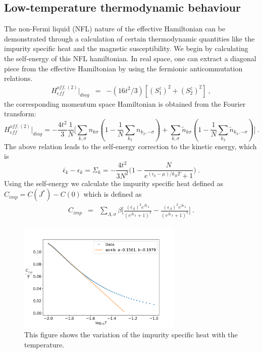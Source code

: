 \documentclass[reprint,onecolumn,prb,superscriptaddress]{revtex4-2}
\begin{document}
\subsection{Low-temperature thermodynamic behaviour}
The non-Fermi liquid (NFL) nature of the effective Hamiltonian can be demonstrated through a calculation of certain thermodynamic quantities like the impurity specific heat and the magnetic susceptibility. We begin by calculating the self-energy of this NFL hamiltonian. In real space, one can extract a diagonal piece from the effective Hamiltonian by using the fermionic anticommutation relations.
\begin{eqnarray}
H_{eff}^{off,(2)} |_{diag} &=& -(16t^2/3) [ (S_1^z)^2+ (S_2^z)^2 ] ~,
\end{eqnarray}
the corresponding momentum space Hamiltonian is obtained from the Fourier transform:
\begin{equation}
H_{eff}^{off,(2)} |_{diag}= -\frac{4t^2}{3} \frac{1}{N} \bigg[ \displaystyle\sum_{k,\sigma} n_{k\sigma}(1-\frac{1}{N} \displaystyle\sum_{k_2}  n_{k_2,-\sigma}  ) + \displaystyle\sum_{k,\sigma} \tilde{n}_{k\sigma} ( 1-\frac{1}{N} \displaystyle\sum_{ k_2} \tilde{n}_{k_2,-\sigma}  ) \bigg]~.
\end{equation}
The above relation leads to the self-energy correction to the kinetic energy, which is
\begin{equation}
\bar{\epsilon} _k-\epsilon_k = \Sigma_k = -\frac{4t^2}{3N^2}\bigg(1-\frac{N}{e^{(\epsilon_k-\mu)/k_BT}+1}\bigg)~.
\label{eq:self-energy-NFL}
\end{equation}
Using the self-energy we calculate the impurity specific heat defined as $C_{imp}=C(J^*)-C(0)$ which is defined as
\begin{eqnarray}
C_{imp} &=& \sum_{\Lambda,\sigma} \beta \bigg[ \frac{(\bar{\epsilon}_{\Lambda})^2 e^{\beta \bar{\epsilon}_{\Lambda}}}{( e^{\beta \bar{\epsilon}_{\Lambda}} +1)^2}  -\frac{({\epsilon}_{\Lambda})^2 e^{\beta {\epsilon}_{\Lambda}}}{( e^{\beta {\epsilon}_{\Lambda}} +1)^2} \bigg]~.
\end{eqnarray}
\begin{figure}[!htb]
\centering
\includegraphics[width=0.7\textwidth]{plt/FINALfittedCvt0p1.png}
\caption{This figure shows the variation of the impurity specific heat with the temperature.}
\label{fig:Cv_imp}
\end{figure}
\end{document}
